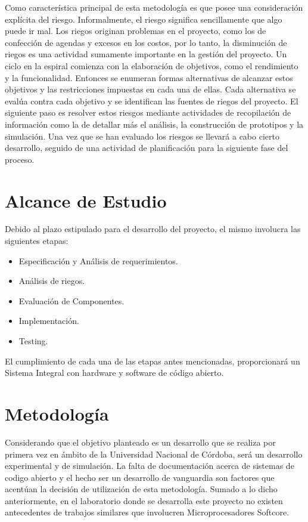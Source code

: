 \vspace{0.5cm}
\par
Como característica principal de esta metodología es que posee una consideración explícita del riesgo. Informalmente, el riesgo significa
sencillamente que algo puede ir mal. Los riegos originan problemas en el proyecto, como los de confección de agendas y excesos en los costos, por lo
tanto, la disminución de riegos es una actividad sumamente importante en la gestión del proyecto. Un ciclo en la espiral comienza con la elaboración
de objetivos, como el rendimiento y la funcionalidad. Entonces se enumeran formas alternativas de alcanzar estos objetivos y las restricciones
impuestas en cada una de ellas. Cada alternativa se evalúa contra cada objetivo y se identifican las fuentes de riegos del proyecto. El siguiente
paso es resolver estos riesgos mediante actividades de recopilación de información como la de detallar más el análisis, la construcción de prototipos
y la simulación. Una vez que se han evaluado los riesgos se llevará a cabo cierto desarrollo, seguido de una actividad de planificación para la
siguiente fase del proceso.

\section{Alcance de Estudio}
\par
Debido al plazo estipulado para el desarrollo del proyecto, el mismo involucra las siguientes etapas: 

\begin {itemize}
	\item Especificación y Análisis de requerimientos.
	\item Análisis de riegos.
	\item Evaluación de Componentes.
	\item Implementación.
	\item Testing.
\end {itemize}

\vspace{0.5cm}
\par
El cumplimiento de cada una de las etapas antes mencionadas, proporcionará un Sistema Integral con hardware y software de código abierto.

\section{Metodología}
\par
Considerando que el objetivo planteado es un desarrollo que se realiza por primera vez en ámbito de la Universidad Nacional de Córdoba, será un
desarrollo experimental y de simulación. La falta de documentación acerca de sistemas de codigo abierto y el hecho ser un desarrollo de vanguardia son
factores que acentúan la decisión de utilización de esta metodología. Sumado a lo dicho anteriormente, en el laboratorio donde se desarrolla este
proyecto no existen antecedentes de trabajos similares que involucren Microprocesadores Softcore.
